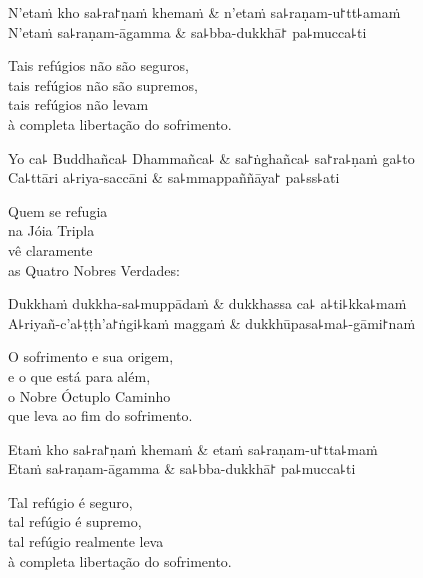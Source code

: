 \begin{twochants}
  N'etaṁ kho sa꜕ra꜓ṇaṁ khemaṁ & n'etaṁ sa꜕raṇam-u꜓tt꜕amaṁ \\
  N'etaṁ sa꜕raṇam-āgamma & sa꜕bba-dukkhā꜓ pa꜕mucca꜕ti \\
\end{twochants}

\begin{english}
  Tais refúgios não são seguros,\\
  tais refúgios não são supremos,\\
  tais refúgios não levam\\
  à completa libertação do sofrimento.
\end{english}

\begin{twochants}
  Yo ca꜕ Buddhañca꜕ Dhammañca꜕ & sa꜓ṅghañca꜕ sa꜓ra꜕ṇaṁ ga꜕to \\
  Ca꜕ttāri a꜕riya-saccāni & sa꜕mmappaññāya꜓ pa꜕ss꜕ati \\
\end{twochants}

\begin{english}
  Quem se refugia\\
  na Jóia Tripla\\
  vê claramente\\
  as Quatro Nobres Verdades:
\end{english}

\begin{twochants}
  Dukkhaṁ dukkha-sa꜕muppādaṁ & dukkhassa ca꜕ a꜕ti꜕kka꜕maṁ \\
  A꜕riyañ-c'a꜕ṭṭh'a꜓ṅgi꜕kaṁ maggaṁ & dukkhūpasa꜕ma꜕-gāmi꜓naṁ \\
\end{twochants}

\begin{english}
  O sofrimento e sua origem,\\
  e o que está para além,\\
  o Nobre Óctuplo Caminho\\
  que leva ao fim do sofrimento.
\end{english}

\begin{twochants}
  Etaṁ kho sa꜕ra꜓ṇaṁ khemaṁ & etaṁ sa꜕raṇam-u꜓tta꜕maṁ \\
  Etaṁ sa꜕raṇam-āgamma & sa꜕bba-dukkhā꜓ pa꜕mucca꜕ti \\
\end{twochants}

\begin{english}
  Tal refúgio é seguro,\\
  tal refúgio é supremo,\\
  tal refúgio realmente leva\\
  à completa libertação do sofrimento.
\end{english}

